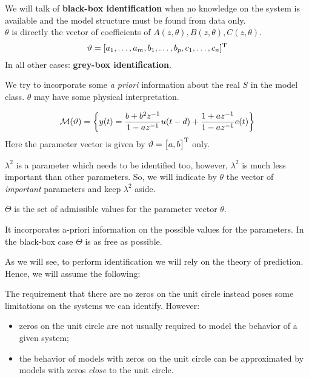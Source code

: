 We will talk of \textbf{black-box identification} when no knowledge on the system is available and the model structure must be found from data only.\\
$\theta$ is directly the vector of coefficients of $A(z, \theta),B(z, \theta),C(z, \theta)$.
$$
	\vartheta=[a_{1},\ldots,a_{m},b_{1},\ldots,b_{p},c_{1},\ldots,c_{n}]^{\mathrm{T}}
$$
In all other cases: \textbf{grey-box identification}.

We try to incorporate some \emph{a priori} information about the real $S$ in the model class. $\theta$ may have some physical interpretation.

\begin{example}
$$
	\mathcal{M}(\vartheta) = \left\{ y(t)=\frac{b+b^{2} z^{-1}}{1-a z^{-1}} u(t-d)+\frac{1+a z^{-1}}{1-a z^{-1}} e(t) \right\}  
$$
Here the parameter vector is given by $\vartheta=\begin{bmatrix}a,b\end{bmatrix}^{\mathrm{T}}$ only.
\end{example}

\begin{obs}
$\lambda^2$ is a parameter which needs to be identified too, however, $\lambda^2$ is much less important than other parameters. So, we will indicate by $\theta$ the vector of \emph{important} parameters and keep $\lambda^2$ aside.
\end{obs}

$\Theta$ is the set of admissible values for the parameter vector $\theta$.

It incorporates a-priori information on the possible values for the parameters. In the black-box case $\Theta$ is as free as possible.

As we will see, to perform identification we will rely on the theory of prediction. Hence, we will assume the following:


The requirement that there are no zeros on the unit circle instead poses some limitations on the systems we can identify. However:
\begin{itemize}
	\item zeros on the unit circle are not usually required to model the behavior of a given system;
	\item the behavior of models with zeros on the unit circle can be approximated by models with zeros \emph{close} to the unit circle.
\end{itemize} 

